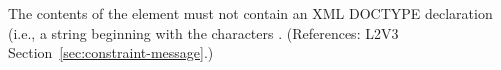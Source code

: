 The contents of the  element must not contain an XML
DOCTYPE declaration (i.e., a string beginning with the characters
.  (References: L2V3 Section~\ref{sec:constraint-message}.)
